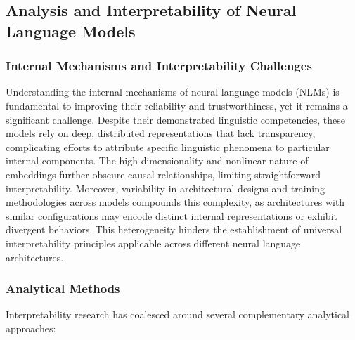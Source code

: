\subsection{Analysis and Interpretability of Neural Language Models}

\subsubsection{Internal Mechanisms and Interpretability Challenges}

Understanding the internal mechanisms of neural language models (NLMs) is fundamental to improving their reliability and trustworthiness, yet it remains a significant challenge. Despite their demonstrated linguistic competencies, these models rely on deep, distributed representations that lack transparency, complicating efforts to attribute specific linguistic phenomena to particular internal components. The high dimensionality and nonlinear nature of embeddings further obscure causal relationships, limiting straightforward interpretability. Moreover, variability in architectural designs and training methodologies across models compounds this complexity, as architectures with similar configurations may encode distinct internal representations or exhibit divergent behaviors. This heterogeneity hinders the establishment of universal interpretability principles applicable across different neural language architectures.

\subsubsection{Analytical Methods}

Interpretability research has coalesced around several complementary analytical approaches:

